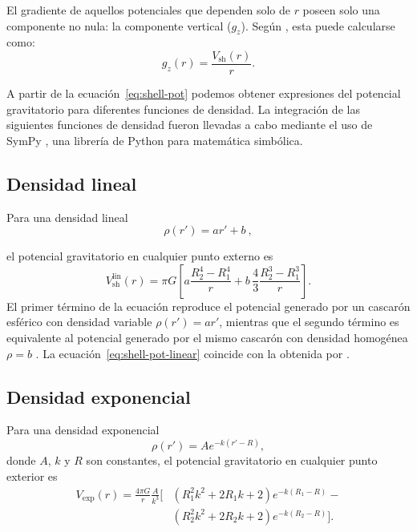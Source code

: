 \begin{subappendices}
El gradiente de aquellos potenciales que dependen solo de $r$ poseen solo una
componente no nula: la componente vertical ($g_z$).
Según \citet{grombein2013}, esta puede calcularse como:
%
\begin{equation}
    g_z(r) = \frac{V_\text{sh}(r)}{r}.
\label{eq:shell-gz}
\end{equation}

A partir de la ecuación~\ref{eq:shell-pot} podemos obtener expresiones del
potencial gravitatorio para diferentes funciones de densidad. La integración de
las siguientes funciones de densidad fueron llevadas a cabo mediante el uso de
SymPy \citep{sympy2017}, una librería de Python para matemática simbólica.

\subsection{Densidad lineal}

Para una densidad lineal
%
\begin{equation}
    \rho(r') = ar' + b\ ,
\end{equation}

\noindent
el potencial gravitatorio en cualquier punto externo es
%
\begin{equation}
    V_\text{sh}^\text{lin}(r) = \pi G \left[
    a \frac{R_2^4 - R_1^4}{r} +
    b \,\frac{4}{3} \frac{R_2^3 - R_1^3}{r} \right].
    \label{eq:shell-pot-linear}
\end{equation}
%
El primer término de la ecuación reproduce el potencial generado por
un cascarón esférico con densidad variable $\rho(r') = ar'$, mientras que el
segundo término es equivalente al potencial generado por el mismo cascarón con
densidad homogénea $\rho = b$ \citep{mikuska2006,grombein2013}.
La ecuación~\ref{eq:shell-pot-linear} coincide con la obtenida por
\citet{lin2019}.

\subsection{Densidad exponencial}

Para una densidad exponencial
%
\begin{equation}
    \rho(r') = A e^{- k (r' - R)},
\end{equation}
%
donde $A$, $k$ y $R$ son constantes, el potencial gravitatorio en
cualquier punto exterior es
%
\begin{equation}
    \begin{split}
        V_\text{exp}(r) = \frac{4\pi G}{r} \frac{A}{k^3} \Big[
        & \left( R_1^2 k^2 + 2 R_1 k + 2 \right) e^{- k (R_1 - R)} - \\
        & \left( R_2^2 k^2 + 2 R_2 k + 2 \right) e^{- k (R_2 - R)}
        \Big].
    \end{split}
\end{equation}



\end{subappendices}
